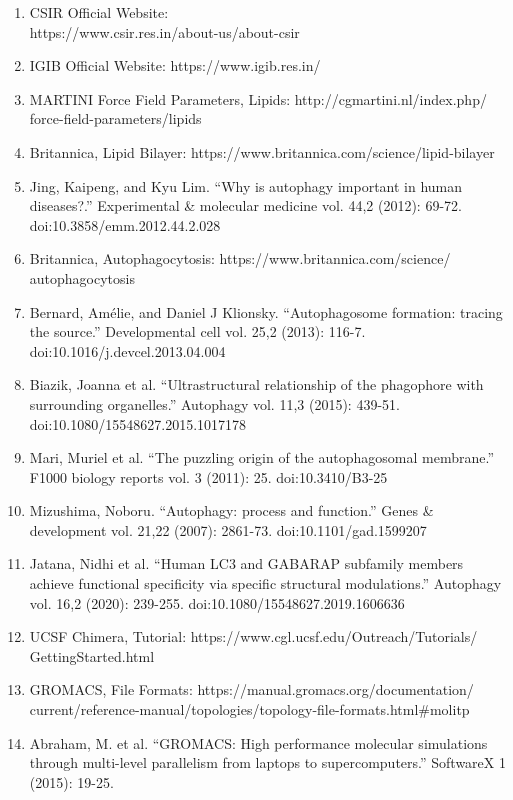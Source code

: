 \documentclass[12pt, a4paper]{report}
\begin{document}
\begin{enumerate}
    \item CSIR Official Website: 
    \\https://www.csir.res.in/about-us/about-csir 
    \item IGIB Official Website: https://www.igib.res.in/  
    \item MARTINI Force Field Parameters, Lipids: http://cgmartini.nl/index.php/
    \\force-field-parameters/lipids 
    \item Britannica, Lipid Bilayer: https://www.britannica.com/science/lipid-bilayer 
    \item Jing, Kaipeng, and Kyu Lim. “Why is autophagy important in human diseases?.” Experimental & molecular medicine vol. 44,2 (2012): 69-72. doi:10.3858/emm.2012.44.2.028 
    \item Britannica, Autophagocytosis: https://www.britannica.com/science/
    \\autophagocytosis 
    \item Bernard, Amélie, and Daniel J Klionsky. “Autophagosome formation: tracing the source.” Developmental cell vol. 25,2 (2013): 116-7. doi:10.1016/j.devcel.2013.04.004 
    \item Biazik, Joanna et al. “Ultrastructural relationship of the phagophore with surrounding organelles.” Autophagy vol. 11,3 (2015): 439-51. doi:10.1080/15548627.2015.1017178 
    \item Mari, Muriel et al. “The puzzling origin of the autophagosomal membrane.” F1000 biology reports vol. 3 (2011): 25. doi:10.3410/B3-25
    \item Mizushima, Noboru. “Autophagy: process and function.” Genes & development vol. 21,22 (2007): 2861-73. doi:10.1101/gad.1599207 
    \item Jatana, Nidhi et al. “Human LC3 and GABARAP subfamily members achieve functional specificity via specific structural modulations.” Autophagy vol. 16,2 (2020): 239-255. doi:10.1080/15548627.2019.1606636 
    \item UCSF Chimera, Tutorial:  https://www.cgl.ucsf.edu/Outreach/Tutorials/
    \\GettingStarted.html 
    \item GROMACS, File Formats: https://manual.gromacs.org/documentation/
    \\current/reference-manual/topologies/topology-file-formats.html\#molitp 
    \item Abraham, M. et al. “GROMACS: High performance molecular simulations through multi-level parallelism from laptops to supercomputers.” SoftwareX 1 (2015): 19-25.

\end{enumerate}
\end{document}
